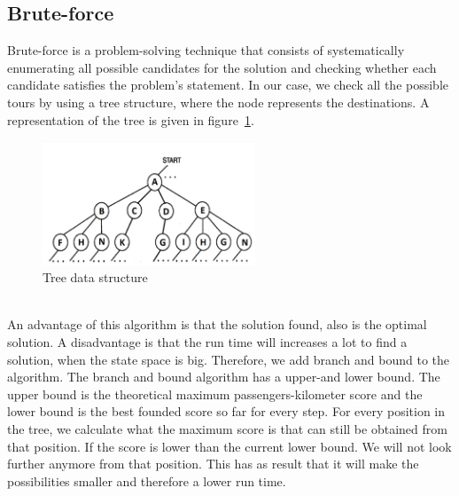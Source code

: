 \documentclass[journal]{IEEEtran}
\begin{document}
\subsection{Brute-force}
Brute-force is a problem-solving technique that consists of systematically enumerating all possible candidates for the solution and checking whether each candidate satisfies the problem's statement. In our case, we check all the possible tours by using a tree structure, where the node represents the destinations. A representation of the tree is given in figure~\ref{fig:tree}.\\
\begin{figure}[!h]
\centering
\includegraphics[width=2.5in]{tree}
\caption{Tree data structure}
\label{fig:tree}
\end{figure}
\\
An advantage of this algorithm is that the solution found, also is  the optimal solution. A disadvantage is that the run time will increases a lot to find a solution, when the state space is big. Therefore, we add branch and bound to the algorithm. The branch and bound algorithm has a upper-and lower bound. The upper bound is the theoretical maximum passengers-kilometer score and the lower bound is the best founded score so far for every step. For every position in the tree, we calculate what the maximum score is that can still be obtained from that position. If the score is lower than the current lower bound. We will not look further anymore from that position. This has as result that it will make the possibilities smaller and therefore a lower run time. 
\end{document}
